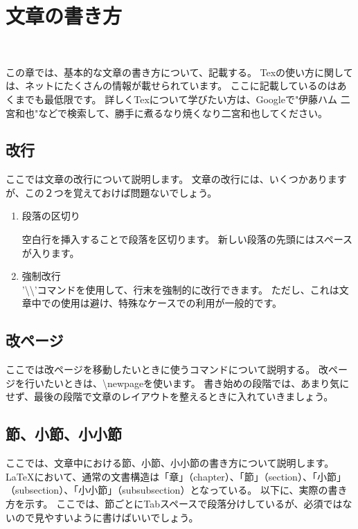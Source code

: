 \chapter{文章の書き方} %
\vspace{20mm}\hrulefill\\\vspace{20mm}

この章では、基本的な文章の書き方について、記載する。
Texの使い方に関しては、ネットにたくさんの情報が載せられています。
ここに記載しているのはあくまでも最低限です。
詳しくTexについて学びたい方は、Googleで"伊藤ハム 二宮和也"などで検索して、勝手に煮るなり焼くなり二宮和也してください。

\section{改行}

ここでは文章の改行について説明します。 
文章の改行には、いくつかありますが、この２つを覚えておけば問題ないでしょう。
\begin{enumerate}
    \item 段落の区切り

    空白行を挿入することで段落を区切ります。
    新しい段落の先頭にはスペースが入ります。
    
    \item 強制改行\\'\textbackslash\textbackslash'コマンドを使用して、行末を強制的に改行できます。
    ただし、これは文章中での使用は避け、特殊なケースでの利用が一般的です。

\end{enumerate}

\section{改ページ}

ここでは改ページを移動したいときに使うコマンドについて説明する。
改ページを行いたいときは、\textbackslash newpageを使います。
書き始めの段階では、あまり気にせず、最後の段階で文章のレイアウトを整えるときに入れていきましょう。

\newpage

\section{節、小節、小小節}

ここでは、文章中における節、小節、小小節の書き方について説明します。
LaTeXにおいて、通常の文書構造は「章」（chapter）、「節」（section）、「小節」（subsection）、「小小節」（subsubsection）となっている。
以下に、実際の書き方を示す。
ここでは、節ごとにTabスペースで段落分けしているが、必須ではないので見やすいように書けばいいでしょう。

